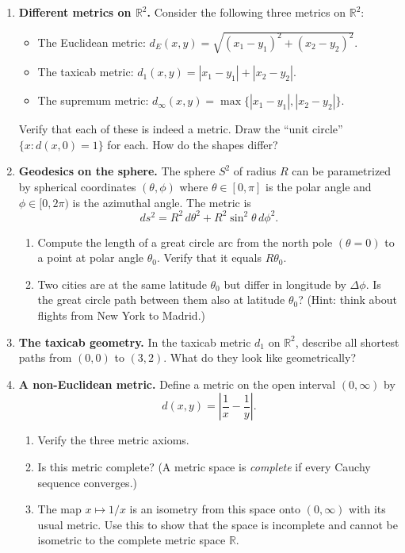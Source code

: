 \begin{enumerate}

    \item \textbf{Different metrics on $\mathbb{R}^2$.} Consider the following three metrics on $\mathbb{R}^2$:
    \begin{itemize}
        \item The Euclidean metric: $d_E(x,y) = \sqrt{(x_1-y_1)^2 + (x_2-y_2)^2}$.
        \item The taxicab metric: $d_1(x,y) = |x_1-y_1| + |x_2-y_2|$.
        \item The supremum metric: $d_\infty(x,y) = \max\{|x_1-y_1|, |x_2-y_2|\}$.
    \end{itemize}
    Verify that each of these is indeed a metric. Draw the ``unit circle'' $\{x : d(x, 0) = 1\}$ for each. How do the shapes differ?

    \item \textbf{Geodesics on the sphere.} The sphere $S^2$ of radius $R$ can be parametrized by spherical coordinates $(\theta, \phi)$ where $\theta \in [0, \pi]$ is the polar angle and $\phi \in [0, 2\pi)$ is the azimuthal angle. The metric is
    \[
        ds^2 = R^2 \, d\theta^2 + R^2 \sin^2\theta \, d\phi^2.
    \]
    \begin{enumerate}
        \item Compute the length of a great circle arc from the north pole $(\theta = 0)$ to a point at polar angle $\theta_0$. Verify that it equals $R\theta_0$.
        \item Two cities are at the same latitude $\theta_0$ but differ in longitude by $\Delta\phi$. Is the great circle path between them also at latitude $\theta_0$? (Hint: think about flights from New York to Madrid.)
    \end{enumerate}

    \item \textbf{The taxicab geometry.} In the taxicab metric $d_1$ on $\mathbb{R}^2$, describe all shortest paths from $(0,0)$ to $(3,2)$. What do they look like geometrically?

    \item \textbf{A non-Euclidean metric.} Define a metric on the open interval $(0, \infty)$ by
    \[
        d(x,y) = \left|\frac{1}{x} - \frac{1}{y}\right|.
    \]
    \begin{enumerate}
        \item Verify the three metric axioms.
        \item Is this metric complete? (A metric space is \emph{complete} if every Cauchy sequence converges.)
        \item The map $x \mapsto 1/x$ is an isometry from this space onto $(0,\infty)$ with its usual metric. Use this to show that the space is incomplete and cannot be isometric to the complete metric space $\mathbb{R}$.
    \end{enumerate}


\end{enumerate}
